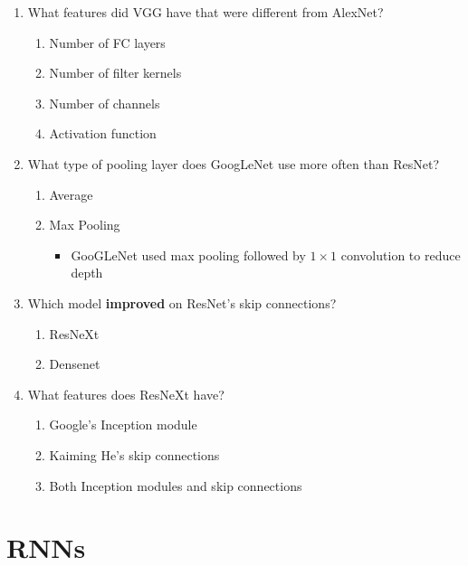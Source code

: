 \documentclass{report}
\numberwithin{equation}{section}
\begin{document}
\begin{enumerate}
\item What features did VGG have that were different from AlexNet?
\begin{enumerate}[label=\alph*.]
\item Number of FC layers
\item Number of filter kernels
\item Number of channels
\item Activation function
\end{enumerate}
\item What type of pooling layer does GoogLeNet use more often than ResNet?
\begin{enumerate}[label=\alph*.]
\item Average
\item Max Pooling
\begin{itemize}
\item GooGLeNet used max pooling followed by $1\times 1$ convolution to reduce depth
\end{itemize}
\end{enumerate}
\item Which model \textbf{improved} on ResNet's skip connections?
\begin{enumerate}[label=\alph*.]
\item ResNeXt
\item Densenet
\end{enumerate}
\item What features does ResNeXt have?
\begin{enumerate}[label=\alph*.]
\item Google's Inception module
\item Kaiming He's skip connections
\item Both Inception modules and skip connections
\end{enumerate}

\end{enumerate}

\section{RNNs}
\end{document}
